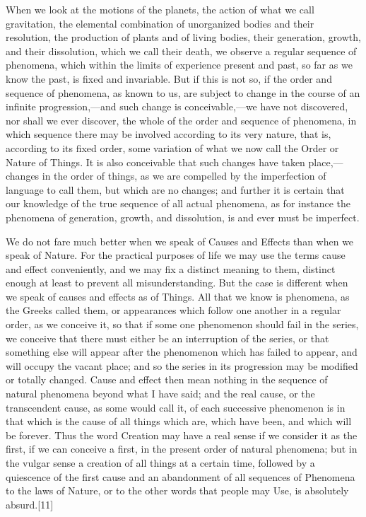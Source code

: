 When we look at the motions of the planets, the action of what we call gravitation, the elemental combination of unorganized bodies and their resolution, the production of plants and of living bodies, their generation, growth, and their dissolution, which we call their death, we observe a regular sequence of phenomena, which within the limits of experience present and past, so far as we know the past, is fixed and invariable. But if this is not so, if the order and sequence of phenomena, as known to us, are subject to change in the course of an infinite progression,—and such change is conceivable,—we have not discovered, nor shall we ever discover, the whole of the order and sequence of phenomena, in which sequence there may be involved according to its very nature, that is, according to its fixed order, some variation of what we now call the Order or Nature of Things. It is also conceivable that such changes have taken place,—changes in the order of things, as we are compelled by the imperfection of language to call them, but which are no changes; and further it is certain that our knowledge of the true sequence of all actual phenomena, as for instance the phenomena of generation, growth, and dissolution, is and ever must be imperfect.

We do not fare much better when we speak of Causes and Effects than when we speak of Nature. For the practical purposes of life we may use the terms cause and effect conveniently, and we may fix a distinct meaning to them, distinct enough at least to prevent all misunderstanding. But the case is different when we speak of causes and effects as of Things. All that we know is phenomena, as the Greeks called them, or appearances which follow one another in a regular order, as we conceive it, so that if some one phenomenon should fail in the series, we conceive that there must either be an interruption of the series, or that something else will appear after the phenomenon which has failed to appear, and will occupy the vacant place; and so the series in its progression may be modified or totally changed. Cause and effect then mean nothing in the sequence of natural phenomena beyond what I have said; and the real cause, or the transcendent cause, as some would call it, of each successive phenomenon is in that which is the cause of all things which are, which have been, and which will be forever. Thus the word Creation may have a real sense if we consider it as the first, if we can conceive a first, in the present order of natural phenomena; but in the vulgar sense a creation of all things at a certain time, followed by a quiescence of the first cause and an abandonment of all sequences of Phenomena to the laws of Nature, or to the other words that people may Use, is absolutely absurd.[11]

